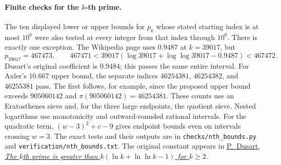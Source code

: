 \paragraph{Finite checks for the \(k\)-th prime.}
The ten displayed lower or upper bounds for $p_k$ whose stated starting index is at most $10^6$ were also tested at every integer from that index through $10^6$. There is exactly one exception. The Wikipedia page uses $0.9487$ at $k=39017$, but
\[
 p_{39017}=467473,\qquad
 467471<39017(\log39017+\log\log39017-0.9487)<467472.
\]
Dusart's original coefficient is $0.9484$; this passes the same entire interval. For Axler's $10.667$ upper bound, the separate indices $46254381$, $46254382$, and $46255381$ pass. The first follows, for example, since the proposed upper bound exceeds $905060142$ and $\pi(905060142)=46254381$. These counts use an Eratosthenes sieve and, for the three large endpoints, the quotient sieve. Nested logarithms use monotonicity and outward-rounded rational intervals. For the quadratic term, $(w-3)^2+c-9$ gives endpoint bounds even on intervals crossing $w=3$. The exact tests and their outputs are in \texttt{checks/nth\_bounds.py} and \texttt{verification/nth\_bounds.txt}. The original constant appears in \href{https://doi.org/10.1090/S0025-5718-99-01037-6}{P.~Dusart, \emph{The $k$th prime is greater than $k(\ln k+\ln\ln k-1)$ for $k\ge2$}}.
